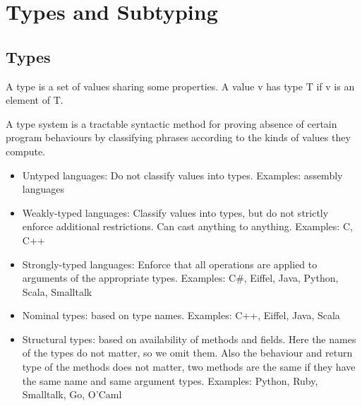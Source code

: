 \section{Types and Subtyping}
\subsection{Types}
\begin{mytitle}[Type] A type is a set of values sharing some properties. A value v has type T if v is an element of T.
\end{mytitle}
\begin{mytitle} A type system is a tractable syntactic method for proving absence of certain program behaviours by classifying phrases according to the kinds of values they compute.
\end{mytitle}
\begin{mytitle} \hfill
\begin{itemize}
    \item Untyped languages: Do not classify values into types. Examples: assembly languages
    \item Weakly-typed languages: Classify values into types, but do not strictly enforce additional restrictions. Can cast anything to anything. Examples: C, C++
    \item Strongly-typed languages: Enforce that all operations are applied to arguments of the appropriate types. Examples: C\#, Eiffel, Java, Python, Scala, Smalltalk 
\end{itemize}
\end{mytitle}
\begin{mytitle} \hfill
\begin{itemize}
    \item Nominal types: based on type names. Examples: C++, Eiffel, Java, Scala
    \item Structural types: based on availability of methods and fields. Here the names of the types do not matter, so we omit them. Also the behaviour and return type of the methods does not matter, two methods are the same if they have the same name and same argument types. Examples: Python, Ruby, Smalltalk, Go, O'Caml
\end{itemize}
\end{mytitle}
